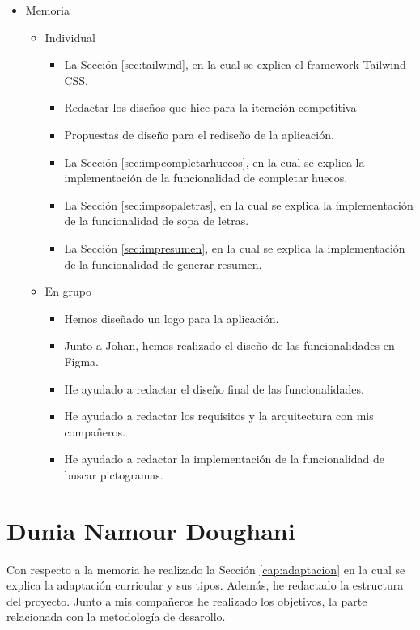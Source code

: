 \begin{itemize}
\begin{itemize}
\begin{itemize}
                    \end{itemize}
          \end{itemize}
    \item Memoria
          \begin{itemize}
              \item Individual
                    \begin{itemize}
                        \item La Sección \ref{sec:tailwind}, en la cual se explica el framework Tailwind CSS.
                        \item Redactar los diseños que hice para la iteración competitiva
                        \item Propuestas de diseño para el rediseño de la aplicación.
                        \item La Sección \ref{sec:impcompletarhuecos}, en la cual se explica la implementación de la funcionalidad de completar huecos.
                        \item La Sección \ref{sec:impsopaletras}, en la cual se explica la implementación de la funcionalidad de sopa de letras.
                        \item La Sección \ref{sec:impresumen}, en la cual se explica la implementación de la funcionalidad de generar resumen.
                    \end{itemize}
              \item En grupo
                    \begin{itemize}
                        \item Hemos diseñado un logo para la aplicación.
                        \item Junto a Johan, hemos realizado el diseño de las funcionalidades en Figma.
                        \item He ayudado a redactar el diseño final de las funcionalidades.
                        \item He ayudado a redactar los requisitos y la arquitectura con mis compañeros.
                        \item He ayudado a redactar la implementación de la funcionalidad de buscar pictogramas.
                    \end{itemize}
          \end{itemize}
\end{itemize}

\section{Dunia Namour Doughani}
Con respecto a la memoria he realizado la Sección \ref{cap:adaptacion} en la cual se explica la adaptación curricular y sus tipos. Además, he redactado la estructura del proyecto. Junto a mis compañeros he realizado los objetivos, la parte relacionada con la metodología de desarollo.

